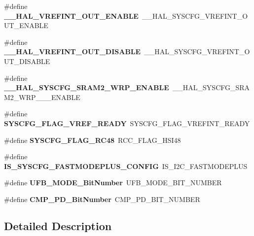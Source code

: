 \begin{DoxyCompactItemize}
\#define {\bfseries \+\_\+\+\_\+\+H\+A\+L\+\_\+\+V\+R\+E\+F\+I\+N\+T\+\_\+\+O\+U\+T\+\_\+\+E\+N\+A\+B\+LE}~\+\_\+\+\_\+\+H\+A\+L\+\_\+\+S\+Y\+S\+C\+F\+G\+\_\+\+V\+R\+E\+F\+I\+N\+T\+\_\+\+O\+U\+T\+\_\+\+E\+N\+A\+B\+LE
\item 
\mbox{\label{group___h_a_l___aliased___macros_ga8ef2904e9bea234864ed664771aeed49}} 
\#define {\bfseries \+\_\+\+\_\+\+H\+A\+L\+\_\+\+V\+R\+E\+F\+I\+N\+T\+\_\+\+O\+U\+T\+\_\+\+D\+I\+S\+A\+B\+LE}~\+\_\+\+\_\+\+H\+A\+L\+\_\+\+S\+Y\+S\+C\+F\+G\+\_\+\+V\+R\+E\+F\+I\+N\+T\+\_\+\+O\+U\+T\+\_\+\+D\+I\+S\+A\+B\+LE
\item 
\mbox{\label{group___h_a_l___aliased___macros_gacc4f47478d9502c7f9326378ddf68967}} 
\#define {\bfseries \+\_\+\+\_\+\+H\+A\+L\+\_\+\+S\+Y\+S\+C\+F\+G\+\_\+\+S\+R\+A\+M2\+\_\+\+W\+R\+P\+\_\+\+E\+N\+A\+B\+LE}~\+\_\+\+\_\+\+H\+A\+L\+\_\+\+S\+Y\+S\+C\+F\+G\+\_\+\+S\+R\+A\+M2\+\_\+\+W\+R\+P\+\_\+\_\+\_\+\+E\+N\+A\+B\+LE
\item 
\mbox{\label{group___h_a_l___aliased___macros_ga2978f132138676255e533e6f18fbe5df}} 
\#define {\bfseries S\+Y\+S\+C\+F\+G\+\_\+\+F\+L\+A\+G\+\_\+\+V\+R\+E\+F\+\_\+\+R\+E\+A\+DY}~S\+Y\+S\+C\+F\+G\+\_\+\+F\+L\+A\+G\+\_\+\+V\+R\+E\+F\+I\+N\+T\+\_\+\+R\+E\+A\+DY
\item 
\mbox{\label{group___h_a_l___aliased___macros_gaaf8b670b9f5fdd39553af1637189456c}} 
\#define {\bfseries S\+Y\+S\+C\+F\+G\+\_\+\+F\+L\+A\+G\+\_\+\+R\+C48}~R\+C\+C\+\_\+\+F\+L\+A\+G\+\_\+\+H\+S\+I48
\item 
\mbox{\label{group___h_a_l___aliased___macros_ga57549e7341a90913bac75a34768b9562}} 
\#define {\bfseries I\+S\+\_\+\+S\+Y\+S\+C\+F\+G\+\_\+\+F\+A\+S\+T\+M\+O\+D\+E\+P\+L\+U\+S\+\_\+\+C\+O\+N\+F\+IG}~I\+S\+\_\+\+I2\+C\+\_\+\+F\+A\+S\+T\+M\+O\+D\+E\+P\+L\+US
\item 
\mbox{\label{group___h_a_l___aliased___macros_gaa531b9c8535235ee73455c2b88663c03}} 
\#define {\bfseries U\+F\+B\+\_\+\+M\+O\+D\+E\+\_\+\+Bit\+Number}~U\+F\+B\+\_\+\+M\+O\+D\+E\+\_\+\+B\+I\+T\+\_\+\+N\+U\+M\+B\+ER
\item 
\mbox{\label{group___h_a_l___aliased___macros_ga0ca336e48ea4840c7d1cde05a0e07e82}} 
\#define {\bfseries C\+M\+P\+\_\+\+P\+D\+\_\+\+Bit\+Number}~C\+M\+P\+\_\+\+P\+D\+\_\+\+B\+I\+T\+\_\+\+N\+U\+M\+B\+ER
\end{DoxyCompactItemize}


\subsection{Detailed Description}
